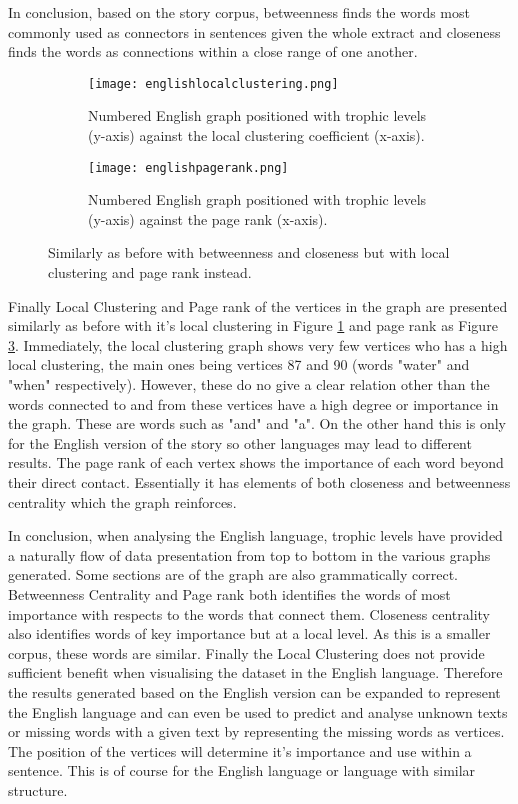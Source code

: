 In conclusion, based on the story corpus, betweenness finds the words most commonly used as connectors in sentences given the whole extract and closeness finds the words as connections within a close range of one another.

\begin{figure}[H]
\centering
\begin{subfigure}{.45\textwidth}
	\hspace{-1cm} 
	\texttt{[image: englishlocalclustering.png]}
	\caption{Numbered English graph positioned with trophic levels (y-axis) against the local clustering coefficient (x-axis).}
	\label{fig:englc}
\end{subfigure}
\hfill
\begin{subfigure}{.45\textwidth}
	\hspace{-1cm} 
	\texttt{[image: englishpagerank.png]}
	\caption{Numbered English graph positioned with trophic levels (y-axis) against the page rank (x-axis).}
	\label{fig:engpr}
\end{subfigure}
\caption{Similarly as before with betweenness and closeness but with local clustering and page rank instead.}
\end{figure}

Finally Local Clustering and Page rank of the vertices in the graph are presented similarly as before with it's local clustering in Figure \ref{fig:englc} and page rank as Figure \ref{fig:engpr}. Immediately, the local clustering graph shows very few vertices who has a high local clustering, the main ones being vertices 87 and 90 (words "water" and "when" respectively). However, these do no give a clear relation other than the words connected to and from these vertices have a high degree or importance in the graph. These are words such as "and" and "a". On the other hand this is only for the English version of the story so other languages may lead to different results. The page rank of each vertex shows the importance of each word beyond their direct contact. Essentially it has elements of both closeness and betweenness centrality which the graph reinforces.

In conclusion, when analysing the English language, trophic levels have provided a naturally flow of data presentation from top to bottom in the various graphs generated. Some sections are of the graph are also grammatically correct. Betweenness Centrality and Page rank both identifies the words of most importance with respects to the words that connect them. Closeness centrality also identifies words of key importance but at a local level. As this is a smaller corpus, these words are similar. Finally the Local Clustering does not provide sufficient benefit when visualising the dataset in the English language. Therefore the results generated based on the English version can be expanded to represent the English language and can even be used to predict and analyse unknown texts or missing words with a given text by representing the missing words as vertices. The position of the vertices will determine it's importance and use within a sentence. This is of course for the English language or language with similar structure.

